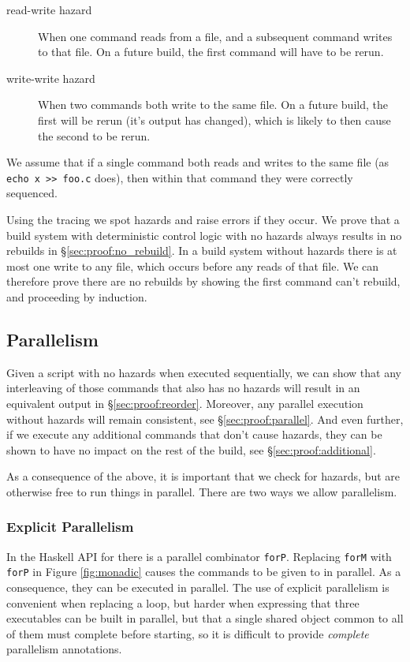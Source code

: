 \begin{description}
\item[read-write hazard] When one command reads from a file, and a subsequent command writes to that file. On a future build, the first command will have to be rerun.
\item[write-write hazard] When two commands both write to the same file. On a future build, the first will be rerun (it's output has changed), which is likely to then cause the second to be rerun.
\end{description}

We assume that if a single command both reads and writes to the same file (as \texttt{echo x >> foo.c} does), then within that command they were correctly sequenced.

Using the tracing we spot hazards and raise errors if they occur. We prove that a build system with deterministic control logic with no hazards always results in no rebuilds in \S\ref{sec:proof:no_rebuild}. In a build system without hazards there is at most one write to any file, which occurs before any reads of that file. We can therefore prove there are no rebuilds by showing the first command can't rebuild, and proceeding by induction.

\subsection{Parallelism}

Given a script with no hazards when executed sequentially, we can show that any interleaving of those commands that also has no hazards will result in an equivalent output in \S\ref{sec:proof:reorder}. Moreover, any parallel execution without hazards will remain consistent, see \S\ref{sec:proof:parallel}. And even further, if we execute any additional commands that don't cause hazards, they can be shown to have no impact on the rest of the build, see \S\ref{sec:proof:additional}.

As a consequence of the above, it is important that we check for hazards, but are otherwise free to run things in parallel. There are two ways we allow parallelism.

\subsubsection{Explicit Parallelism}

In the Haskell API for \Rattle there is a parallel combinator \texttt{forP}. Replacing \texttt{forM} with \texttt{forP} in Figure \ref{fig:monadic} causes the commands to be given to \Rattle in parallel. As a consequence, they can be executed in parallel. The use of explicit parallelism is convenient when replacing a loop, but harder when expressing that three executables can be built in parallel, but that a single shared object common to all of them must complete before starting, so it is difficult to provide \emph{complete} parallelism annotations.

